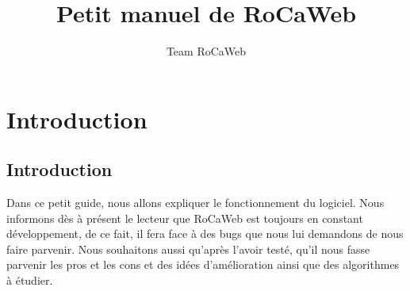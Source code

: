 \documentclass[a4paper,10pt,justified]{book}
\title{Petit manuel de RoCaWeb}
\author{Team RoCaWeb}
\newcommand{\monthyear}{\ifcase\month\or January\or February\or March\or April\or May\or June\or July\or August\or September\or October\or November\or December\fi\space\number\year} %
\begin{document}
\frontmatter



\maketitle %

% 
% 
% 
% 
% 


\tableofcontents %









\chapter{Introduction}
\section{Introduction}
Dans ce petit guide, nous allons expliquer le fonctionnement du logiciel. Nous informons dès à présent le lecteur
que RoCaWeb est toujours en constant développement, de ce fait, il fera face à des bugs que nous lui demandons de nous
faire parvenir. Nous souhaitons aussi qu'après l'avoir testé, qu'il nous fasse parvenir les pros et les cons et des idées d'amélioration
ainsi que des algorithmes à étudier.
\end{document}
